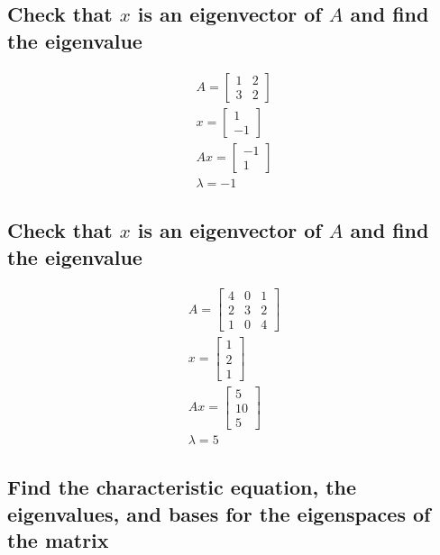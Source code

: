 \documentclass[12pt, a4paper]{article}
\begin{document}
		\subsection{Check that $x$ is an eigenvector of $A$ and find the eigenvalue}
			\begin{align*}
				A=\begin{bmatrix}1&2\\3&2\end{bmatrix}\\
				x=\begin{bmatrix}1\\-1\end{bmatrix}\\
				Ax=\begin{bmatrix}-1\\1\end{bmatrix}\\
				\lambda = -1
			\end{align*}
		\subsection{Check that $x$ is an eigenvector of $A$ and find the eigenvalue}
			\begin{align*}
				A=\begin{bmatrix}4 & 0 & 1\\ 2 & 3 &2 \\ 1 & 0 & 4\end{bmatrix}\\
				x=\begin{bmatrix}1\\2\\1\end{bmatrix}\\
				Ax=\begin{bmatrix}5\\ 10 \\ 5\end{bmatrix}\\
				\lambda = 5
			\end{align*}
		\subsection{Find the characteristic equation, the eigenvalues, and bases for the eigenspaces of the matrix}
\end{document}

